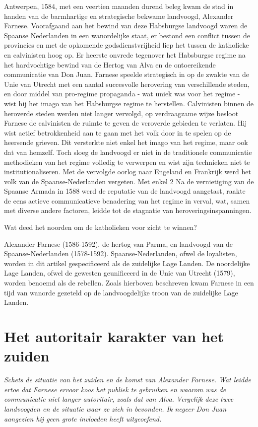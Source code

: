 \documentclass[11pt]{amsart}
\begin{document}
\noindent Antwerpen, 1584, met een veertien maanden durend beleg kwam de stad in handen van de barmhartige en
strategische bekwame landvoogd, Alexander Farnese. Voorafgaand aan het bewind van deze Habsburgse landvoogd waren de
Spaanse Nederlanden in een wanordelijke staat, er bestond een conflict tussen de provincies en met de opkomende
godsdienstvrijheid liep het tussen de katholieke en calvinisten hoog op. Er heerste
onvrede tegenover het Habsburgse regime na het hardvochtige bewind van de Hertog van Alva en de ontoereikende communicatie van Don Juan.
Farnese speelde strategisch in op de zwakte van de Unie van Utrecht met een
aantal succesvolle herovering van verschillende steden, en door middel van pro-regime propaganda - wat uniek was voor
het regime - wist hij het imago van het Habsburgse regime te herstellen. Calvinisten binnen de heroverde steden werden
niet langer vervolgd, op verdraagzame wijze besloot Farnese de calvinisten de ruimte te geven de veroverde gebieden te verlaten.
Hij wist actief betrokkenheid aan te gaan met het volk door in te spelen op de heersende grieven. Dit versterkte niet
enkel het imago van het regime, maar ook dat van hemzelf. Toch sloeg de landvoogd er niet in de traditionele communicatie
methodieken van het regime volledig te verwerpen en wist zijn technieken niet te institutionaliseren.
Met de vervolgde oorlog naar Engeland en Frankrijk werd het volk van de Spaanse-Nederlanden vergeten. Met enkel 2
Na de vernietiging van de Spaanse Armada in 1588 werd de reputatie van de landvoogd aangetast, raakte de
eens actieve communicatieve benadering van het regime in verval, wat, samen met diverse andere factoren,
leidde tot de stagnatie van heroveringsinspanningen.

Wat deed het noorden om de katholieken voor zicht te winnen?

Alexander Farnese (1586-1592), de hertog van Parma, en landvoogd van de Spaanse-Nederlanden (1578-1592).
Spaanse-Nederlanden, ofwel de loyalisten, worden in dit artikel gespecificeerd als de zuidelijke Lage Landen. De
noordelijke Lage Landen, ofwel de gewesten geunificeerd in de Unie van Utrecht (1579), worden benoemd als de rebellen.
Zoals hierboven beschreven kwam Farnese in een tijd van wanorde gezeteld op de landvoogdelijke troon van de zuidelijke
Lage Landen.

\newpage

\section{Het autoritair karakter van het zuiden}
\textit{Schets de situatie van het zuiden en de komst van Alexander Farnese. Wat leidde ertoe dat Farnese ervoor koos het
     publiek te gebruiken en waarom was de communicatie niet langer autoritair, zoals dat van Alva. Vergelijk deze twee
     landvoogden en de situatie waar ze zich in bevonden. Ik negeer Don Juan aangezien hij geen grote invloeden heeft
     uitgeoefend.}
\end{document}
